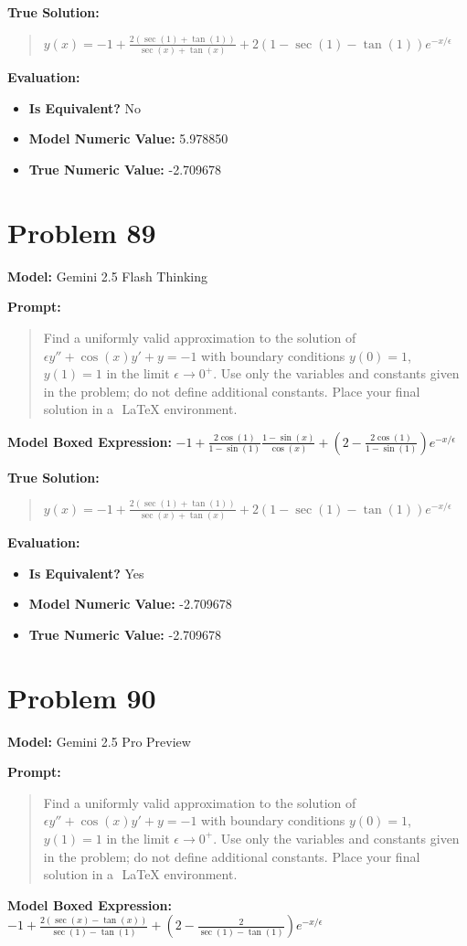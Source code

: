 \documentclass{article}
\begin{document}
{\textbf{True Solution:}
\begin{quote}
$y(x) = -1 + \frac{2(\sec(1) + \tan(1))}{\sec(x) + \tan(x)} + 2(1 - \sec(1) - \tan(1))e^{-x/\epsilon}$
\end{quote}

\textbf{Evaluation:}
\begin{itemize}
\item \textbf{Is Equivalent?} No
\item \textbf{Model Numeric Value:} 5.978850
\item \textbf{True Numeric Value:} -2.709678
\end{itemize}
\vspace{1cm}
\section*{Problem 89}
\textbf{Model:} Gemini 2.5 Flash Thinking

\textbf{Prompt:}
\begin{quote}
Find a uniformly valid approximation to the solution of $\epsilon y'' + \cos(x)y' + y = -1$ with boundary conditions $y(0) = 1$, $y(1) = 1$ in the limit $\epsilon \rightarrow 0^+$. Use only the variables and constants given in the problem; do not define additional constants. Place your final solution in a $\boxed{}$ LaTeX environment.
\end{quote}
\textbf{Model Boxed Expression:} $-1 + \frac{2\cos(1)}{1-\sin(1)} \frac{1-\sin(x)}{\cos(x)} + \left(2 - \frac{2\cos(1)}{1-\sin(1)}\right)e^{-x/\epsilon}$

\textbf{True Solution:}
\begin{quote}
$y(x) = -1 + \frac{2(\sec(1) + \tan(1))}{\sec(x) + \tan(x)} + 2(1 - \sec(1) - \tan(1))e^{-x/\epsilon}$
\end{quote}

\textbf{Evaluation:}
\begin{itemize}
\item \textbf{Is Equivalent?} Yes
\item \textbf{Model Numeric Value:} -2.709678
\item \textbf{True Numeric Value:} -2.709678
\end{itemize}
\vspace{1cm}
\section*{Problem 90}
\textbf{Model:} Gemini 2.5 Pro Preview

\textbf{Prompt:}
\begin{quote}
Find a uniformly valid approximation to the solution of $\epsilon y'' + \cos(x)y' + y = -1$ with boundary conditions $y(0) = 1$, $y(1) = 1$ in the limit $\epsilon \rightarrow 0^+$. Use only the variables and constants given in the problem; do not define additional constants. Place your final solution in a $\boxed{}$ LaTeX environment.
\end{quote}
\textbf{Model Boxed Expression:} $-1 + \frac{2(\sec(x)-\tan(x))}{\sec(1)-\tan(1)} + \left(2 - \frac{2}{\sec(1)-\tan(1)}\right)e^{-x/\epsilon}$

}
\end{document}
